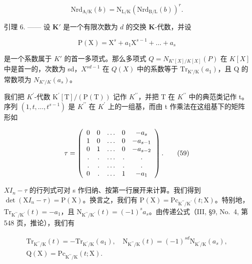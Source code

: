 \[
\mathrm{Nrd} _ {\mathrm{A/K}} (b) = \mathrm{N} _ {\mathrm{L/K}} (\mathrm{Nrd} _ {\mathrm{B/L}} (b)) ^ {r}.\tag{58}
\]

引理 6. —— 设 \(\mathbf{K}'\) 是一个有限次数为 \(d\) 的交换 \(\mathbf{K}\)-代数，并设

\[
\mathrm{P} (\mathrm{X}) = \mathrm{X} ^ {s} + a _ {1} \mathrm{X} ^ {s - 1} + \dots + a _ {s}
\]

是一个系数属于 \(K'\) 的首一多项式。那么多项式 \(Q = N_{K'[X]/K[X]}(P)\) 在 \(K[X]\) 中是首一的，次数为 sd，\(X^{sd-1}\) 在 \(Q(X)\) 中的系数等于 \(\mathrm{Tr}_{\mathrm{K}'/\mathrm{K}}(a_1)\)，且 Q 的常数项为 \(N_{K'/K}(a_s)\)。

我们把 \(K^{\prime}\)-代数 \(\mathrm{K}^{\prime}[\mathrm{T}]/( \mathrm{P}(\mathrm{T}))\) 记作 \(K^{\prime\prime}\)，并把 T 在 \(K^{\prime\prime}\) 中的典范类记作 t。序列 \((1, t, \ldots, t^{s-1})\) 是 \(K^{\prime\prime}\) 在 \(K^{\prime}\) 上的一组基，而由 t 作乘法在这组基下的矩阵形如

\[
\tau = \left( \begin{array}{c c c c c} 0 & 0 & \dots & 0 & - a _ {s} \\ 1 & 0 & \dots & 0 & - a _ {s - 1} \\ 0 & 1 & \dots & 0 & - a _ {s - 2} \\ . & . & \dots & . & . \\ . & . & \dots & . & . \\ 0 & . & \dots & 1 & - a _ {1} \end{array} \right).\tag{59}
\]

\(XI_{n}-\tau\) 的行列式可对 s 作归纳、按第一行展开来计算。我们得到 \(\det(\mathrm{X}I_{n}-\tau)=\mathrm{P}(\mathrm{X})\)。换言之，我们有 \(\mathrm{P}(\mathrm{X})=\mathrm{P}\mathrm{c}_{\mathrm{K}^{\prime\prime}/\mathrm{K}^{\prime}}(t;\mathrm{X})\)。特别地，\(\mathrm{Tr}_{\mathrm{K}^{\prime\prime}/\mathrm{K}^{\prime}}(t)=-a_{1}\)，且 \(\mathrm{N}_{\mathrm{K}^{\prime\prime}/\mathrm{K}^{\prime}}(t)=(-1)^{s}a_{s}\)。由传递公式（III, §9, No.~4, 第 548 页，推论），我们有

\[
\begin{array}{r} \mathrm{Tr} _ {\mathrm{K} ^ {\prime \prime} / \mathrm{K}} (t) = - \mathrm{Tr} _ {\mathrm{K} ^ {\prime} / \mathrm{K}} (a _ {1}), \quad \mathrm{N} _ {\mathrm{K} ^ {\prime \prime} / \mathrm{K}} (t) = (- 1) ^ {s d} \mathrm{N} _ {\mathrm{K} ^ {\prime} / \mathrm{K}} (a _ {s}), \\ \mathrm{Q} (\mathrm{X}) = \mathrm{Pc} _ {\mathrm{K} ^ {\prime \prime} / \mathrm{K}} (t; \mathrm{X}). \end{array}
\]

